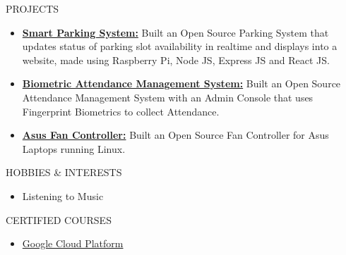 \documentclass{resume}
\begin{document}
\begin{rSection}{PROJECTS}
\begin{itemize}
    \item \textbf{\href{https://github.com/Arkapravo-Ghosh/Smart-Parking-System}{Smart Parking System:}} {Built an Open Source Parking System that updates status of parking slot availability in realtime and displays into a website, made using Raspberry Pi, Node JS, Express JS and React JS.}

    \item \textbf{\href{https://github.com/Arkapravo-Ghosh/attendance-monitoring-system}{Biometric Attendance Management System:}} {Built an Open Source Attendance Management System with an Admin Console that uses Fingerprint Biometrics to collect Attendance.}

    \item \textbf{\href{https://github.com/Arkapravo-Ghosh/asus-fan-mode}{Asus Fan Controller:}} {Built an Open Source Fan Controller for Asus Laptops running Linux.}
\end{itemize}
\end{rSection}
\vspace{0.8em}

\begin{rSection}{HOBBIES \& INTERESTS}
\begin{itemize}
    \item Listening to Music
\end{itemize}
\end{rSection}
\vspace{0.8em}

\begin{rSection}{CERTIFIED COURSES}
\begin{itemize}
    \item \href{https://www.cloudskillsboost.google/public_profiles/7594501c-7933-4fba-be9b-2a92ca3ee410}{Google Cloud Platform}
\end{itemize}
\end{rSection}
\end{document}
